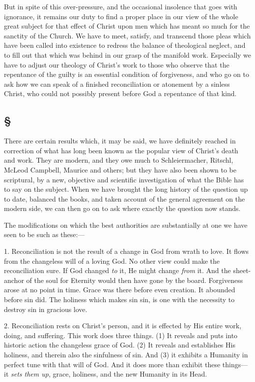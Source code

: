 \documentclass[draft]{ptfdoc}
\begin{document}
But in spite of this over-pressure, and the 
occasional insolence that goes with ignorance, 
it remains our duty to find a proper place in 
our view of the whole great subject for that 
effect of Christ upon men which has meant so 
much for the sanctity of the Church. We have 
to meet, satisfy, and transcend those pleas which 
have been called into existence to redress the 
balance of theological neglect, and to fill out 
that which was behind in our grasp of the 
manifold work. Especially we have to adjust 
our theology of Christ's work to those who 
observe that the repentance of the guilty is an 
essential condition of forgiveness, and who go 
on to ask how we can speak of a finished 
reconciliation or atonement by a sinless Christ, 
who could not possibly present before God a 
repentance of that kind. 

\subsection*{
\S
}

There are certain results which, it may be 
said, we have definitely reached in correction 
of what has long been known as the popular 
view of Christ's death and work. They are 
modern, and they owe much to Schleiermacher, 
Ritschl, McLeod Campbell, Maurice and others; 
but they have also been shown to be scriptural, 
by a new, objective and scientific investigation 
of what the Bible has to say on the subject. 
When we have brought the long history of 
the question up to date, balanced the books, 
and taken account of the general agreement 
on the modern side, we can then go on to ask 
where exactly the question now stands. 

The modifications on which the best authorities 
are substantially at one we have seen to be 
such as these:--- 

1. Reconciliation is not the result of a change 
in God from wrath to love. It flows from the 
changeless will of a loving God. No other view 
could make the reconciliation sure. If God 
changed \textit{to} it, He might change \textit{from} it. And 
the sheet-anchor of the soul for Eternity would 
then have gone by the board. Forgiveness 
arose at no point in time. Grace was there 
before even creation. It abounded before sin 
did. The holiness which makes sin sin, is one 
with the necessity to destroy sin in gracious 
love. 

2. Reconciliation rests on Christ's person, 
and it is effected by His entire work, doing, and 
suffering. This work does three things. (1) It 
reveals and puts into historic action the changeless 
grace of God. (2) It reveals and establishes 
His holiness, and therein also the sinfulness of 
sin. And (3) it exhibits a Humanity in perfect 
tune with that will of God. And it does more 
than exhibit these things---it \textit{sets them up}, grace, 
holiness, and the new Humanity in its Head. 
\end{document}
